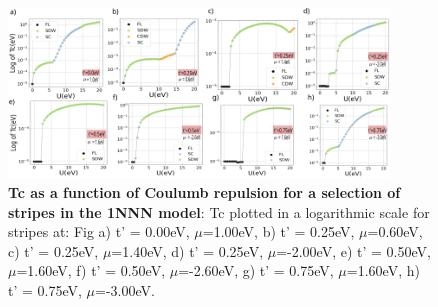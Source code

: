 \documentclass[12pt]{article}
\begin{document}
\begin{figure}[htbp]  %
    \centering
    \includegraphics[width=0.90\textwidth]{1NNNstripes.png}  %
    \caption{\textbf{Tc as a function of Coulumb repulsion for a selection of stripes in the 1NNN model}: Tc plotted in
    a logarithmic scale for stripes at:  Fig a) t' = 0.00eV, $\mu$=1.00eV, b) t' = 0.25eV, $\mu$=0.60eV, c) t' = 0.25eV, $\mu$=1.40eV,
    d) t' = 0.25eV, $\mu$=-2.00eV,
    e) t' = 0.50eV, $\mu$=1.60eV,
    f) t' = 0.50eV, $\mu$=-2.60eV,
    g) t' = 0.75eV, $\mu$=1.60eV, 
    h) t' = 0.75eV, $\mu$=-3.00eV.}
    \label{fig:1NNNStripes}
\end{figure}
\end{document}
